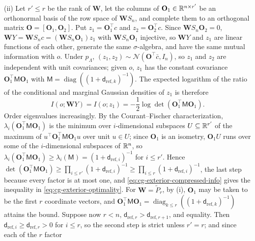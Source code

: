 (ii) Let \(r'\leq r\) be the rank of \(\mathbf W\), let the columns of
\(\mathbf O_1\in\mathbb R^{n\times r'}\) be an orthonormal basis of the row space of
\(\mathbf WS_n\), and complete them to an orthogonal matrix
\(\mathbf O=[\mathbf O_1,\mathbf O_2]\). Put \(z_1=\mathbf O_1^\top c\) and
\(z_2=\mathbf O_2^\top c\). Since \(\mathbf WS_n\mathbf O_2=0\),
\(\mathbf WY=\mathbf WS_nc=(\mathbf WS_n\mathbf O_1)z_1\) with \(\mathbf WS_n\mathbf O_1\)
injective, so \(\mathbf WY\) and \(z_1\) are linear functions of each other,
generate the same \(\sigma\)-algebra, and have the same mutual information with
\(o\). Under \(p_\Lambda\), \((z_1,z_2)\sim\mathcal N(\mathbf O^\top\bar c,I_n)\), so
\(z_1\) and \(z_2\) are independent with unit covariances; given \(o\), \(z_1\) has
the constant covariance \(\mathbf O_1^\top\mathsf M\mathbf O_1\) with
\(\mathsf M=\operatorname{diag}((1+\mathsf d_{\mathrm{ref},k})^{-1})\). The expected
logarithm of the ratio of the conditional and marginal Gaussian densities of
\(z_1\) is therefore
\begin{equation}
I(o;\mathbf WY)=I(o;z_1)=-\frac12\log\det\left(\mathbf O_1^\top\mathsf M\mathbf O_1\right).
\label{eq:cg-exterior-compressed-info}
\end{equation}
Order eigenvalues increasingly. By the Courant--Fischer characterization,
\(\lambda_i(\mathbf O_1^\top\mathsf M\mathbf O_1)\) is the minimum over
\(i\)-dimensional subspaces \(U\subseteq\mathbb R^{r'}\) of the maximum of
\(u^\top\mathbf O_1^\top\mathsf M\mathbf O_1u\) over unit \(u\in U\); since
\(\mathbf O_1\) is an isometry, \(\mathbf O_1U\) runs over some of the
\(i\)-dimensional subspaces of \(\mathbb R^n\), so
\(\lambda_i(\mathbf O_1^\top\mathsf M\mathbf O_1)\geq\lambda_i(\mathsf M)=(1+\mathsf d_{\mathrm{ref},i})^{-1}\)
for \(i\leq r'\). Hence
\(\det(\mathbf O_1^\top\mathsf M\mathbf O_1)\geq\prod_{i\leq r'}(1+\mathsf d_{\mathrm{ref},i})^{-1}\geq\prod_{i\leq r}(1+\mathsf d_{\mathrm{ref},i})^{-1}\),
the last step because every factor is at most one, and
\eqref{eq:cg-exterior-compressed-info} gives the inequality in
\eqref{eq:cg-exterior-optimality}. For \(\mathbf W=\widetilde P_r\), by (i),
\(\mathbf O_1\) may be taken to be the first \(r\) coordinate vectors, and
\(\mathbf O_1^\top\mathsf M\mathbf O_1=\operatorname{diag}_{k\leq r}((1+\mathsf d_{\mathrm{ref},k})^{-1})\)
attains the bound. Suppose now \(r<n\),
\(\mathsf d_{\mathrm{ref},r}>\mathsf d_{\mathrm{ref},r+1}\), and equality. Then
\(\mathsf d_{\mathrm{ref},i}\geq\mathsf d_{\mathrm{ref},r}>0\) for \(i\leq r\), so
the second step is strict unless \(r'=r\); and since each of the \(r\) factor
